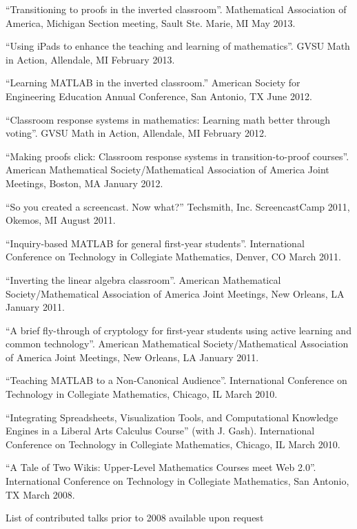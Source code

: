 \documentclass[letterpaper]{article}
\renewenvironment{itemize}{
  \begin{list}{}{
    \setlength{\leftmargin}{1.5em}
	\setlength{\itemsep}{0in}
  }
}{
  \end{list}
}
\begin{document}
\begin{itemize}
	\item ``Transitioning to proofs in the inverted classroom''. Mathematical Association of America, Michigan Section meeting, Sault Ste. Marie, MI May 2013.
	\item ``Using iPads to enhance the teaching and learning of mathematics''. GVSU Math in Action, Allendale, MI February 2013.
	\item ``Learning MATLAB in the inverted classroom.'' American Society for Engineering Education Annual Conference, San Antonio, TX June 2012.
	\item ``Classroom response systems in mathematics: Learning math better through voting''. GVSU Math in Action, Allendale, MI February 2012.
	\item ``Making proofs click: Classroom response systems in transition-to-proof courses''. American Mathematical Society/Mathematical Association of America Joint Meetings, Boston, MA January 2012.
	\item ``So you created a screencast. Now what?'' Techsmith, Inc. ScreencastCamp 2011, Okemos, MI August 2011.
	\item ``Inquiry-based MATLAB for general first-year students''. International Conference on Technology in Collegiate Mathematics, Denver, CO March 2011.
	\item ``Inverting the linear algebra classroom''. American Mathematical Society/Mathematical Association of America Joint Meetings, New Orleans, LA January 2011.
	\item ``A brief fly-through of cryptology for first-year students using active learning and common technology''.   American Mathematical Society/Mathematical Association of America Joint Meetings, New Orleans, LA January 2011.
	\item ``Teaching MATLAB to a Non-Canonical Audience''. International Conference on Technology in Collegiate Mathematics, Chicago, IL March 2010.
	\item ``Integrating Spreadsheets, Visualization Tools, and Computational Knowledge Engines in a Liberal Arts Calculus Course'' (with J. Gash). International Conference on Technology in Collegiate Mathematics, Chicago, IL March 2010.
	\item ``A Tale of Two Wikis: Upper-Level Mathematics Courses meet Web 2.0''. International Conference on Technology in Collegiate Mathematics, San Antonio, TX March 2008.
\end{itemize}

\begin{center}
  \begin{footnotesize}
    List of contributed talks prior to 2008 available upon request
  \end{footnotesize}
\end{center}
\end{document}
